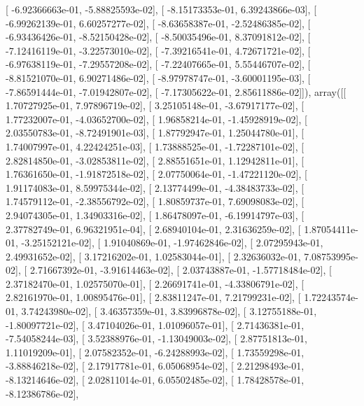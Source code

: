 \documentclass{article}
\begin{document}
       [ -6.92366663e-01,  -5.88825593e-02],
       [ -8.15173353e-01,   6.39243866e-03],
       [ -6.99262139e-01,   6.60257277e-02],
       [ -8.63658387e-01,  -2.52486385e-02],
       [ -6.93436426e-01,  -8.52150428e-02],
       [ -8.50035496e-01,   8.37091812e-02],
       [ -7.12416119e-01,  -3.22573010e-02],
       [ -7.39216541e-01,   4.72671721e-02],
       [ -6.97638119e-01,  -7.29557208e-02],
       [ -7.22407665e-01,   5.55446707e-02],
       [ -8.81521070e-01,   6.90271486e-02],
       [ -8.97978747e-01,  -3.60001195e-03],
       [ -7.86591444e-01,  -7.01942807e-02],
       [ -7.17305622e-01,   2.85611886e-02]]), array([[  1.70727925e-01,   7.97896719e-02],
       [  3.25105148e-01,  -3.67917177e-02],
       [  1.77232007e-01,  -4.03652700e-02],
       [  1.96858214e-01,  -1.45928919e-02],
       [  2.03550783e-01,  -8.72491901e-03],
       [  1.87792947e-01,   1.25044780e-01],
       [  1.74007997e-01,   4.22424251e-03],
       [  1.73888525e-01,  -1.72287101e-02],
       [  2.82814850e-01,  -3.02853811e-02],
       [  2.88551651e-01,   1.12942811e-01],
       [  1.76361650e-01,  -1.91872518e-02],
       [  2.07750064e-01,  -1.47221120e-02],
       [  1.91174083e-01,   8.59975344e-02],
       [  2.13774499e-01,  -4.38483733e-02],
       [  1.74579112e-01,  -2.38556792e-02],
       [  1.80859737e-01,   7.69098083e-02],
       [  2.94074305e-01,   1.34903316e-02],
       [  1.86478097e-01,  -6.19914797e-03],
       [  2.37782749e-01,   6.96321951e-04],
       [  2.68940104e-01,   2.31636259e-02],
       [  1.87054411e-01,  -3.25152121e-02],
       [  1.91040869e-01,  -1.97462846e-02],
       [  2.07295943e-01,   2.49931652e-02],
       [  3.17216202e-01,   1.02583044e-01],
       [  2.32636032e-01,   7.08753995e-02],
       [  2.71667392e-01,  -3.91614463e-02],
       [  2.03743887e-01,  -1.57718484e-02],
       [  2.37182470e-01,   1.02575070e-01],
       [  2.26691741e-01,  -4.33806791e-02],
       [  2.82161970e-01,   1.00895476e-01],
       [  2.83811247e-01,   7.21799231e-02],
       [  1.72243574e-01,   3.74243980e-02],
       [  3.46357359e-01,   3.83996878e-02],
       [  3.12755188e-01,  -1.80097721e-02],
       [  3.47104026e-01,   1.01096057e-01],
       [  2.71436381e-01,  -7.54058244e-03],
       [  3.52388976e-01,  -1.13049003e-02],
       [  2.87751813e-01,   1.11019209e-01],
       [  2.07582352e-01,  -6.24288993e-02],
       [  1.73559298e-01,  -3.88846218e-02],
       [  2.17917781e-01,   6.05068954e-02],
       [  2.21298493e-01,  -8.13214646e-02],
       [  2.02811014e-01,   6.05502485e-02],
       [  1.78428578e-01,  -8.12386786e-02],
\end{document}

